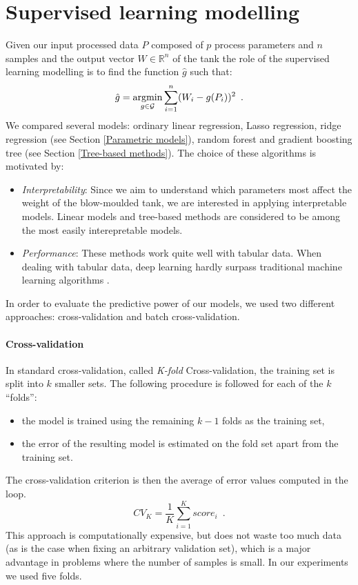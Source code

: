 \section{Supervised learning modelling}

Given our input processed data $P$ composed of $p$ process parameters and $n$ samples and the output vector $W \in \mathds{R}^{n}$ of the tank the role of the supervised learning modelling is to find the function $\hat{g}$ such that:
%
\begin{equation}
    \hat{g} = \operatorname*{argmin}_{g \in \mathcal{G}} \sum_{i=1}^n (W_{i} - g(P_{i}))^{2} \enspace.
\end{equation}
%
We compared several models: ordinary linear regression, Lasso regression, ridge regression (see Section \ref{Parametric models}), random forest and gradient boosting tree (see Section \ref{Tree-based methods}). The choice of these algorithms is motivated by:
%
\begin{itemize}
    \item \textit{Interpretability}: Since we aim to understand which parameters most affect the weight of the blow-moulded tank, we are interested in applying interpretable models. Linear models and tree-based methods are considered to be among the most easily interepretable models.
    \item \textit{Performance}: These methods work quite well with tabular data. When dealing with tabular data, deep learning hardly surpass traditional machine learning algorithms \citep{shwartz2021tabular}. 
\end{itemize}
%
In order to evaluate the predictive power of our models, we used two different approaches: cross-validation and batch cross-validation. 

\paragraph{Cross-validation}

In standard cross-validation, called \textit{K-fold} Cross-validation, the training set is split into $k$ smaller sets. The following procedure is followed for each of the $k$ “folds”:
%
\begin{itemize}
    \item the model is trained using the remaining $k - 1$ folds as the training set,
    \item the error of the resulting model is estimated on the fold set apart from the training set.
\end{itemize}
%
The cross-validation criterion is then the average of error values computed in the loop.
%
\begin{equation}
    CV_{K} = \frac{1}{K}\sum_{i=1}^{K}score_{i}
    \enspace.
\end{equation}
%
This approach is computationally expensive, but does not waste too much data (as is the case when fixing an arbitrary validation set), which is a major advantage in problems where the number of samples is small. In our experiments we used five folds.

